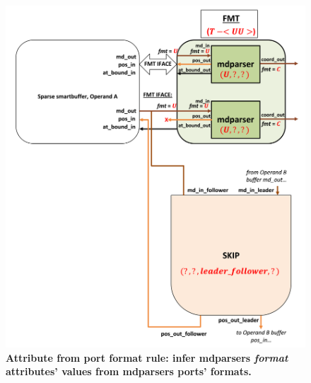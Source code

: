 \begin{figure}[ht]
\includegraphics[width=\textwidth]{figures/safinference_build_05mdparserfmtattr.png}
\caption{\textbf{Attribute from port format rule: infer mdparsers \textit{format} attributes' values from mdparsers ports' formats.}}
\label{fig:safinference_build_05mdparserfmtattr}
\centering
\end{figure}




